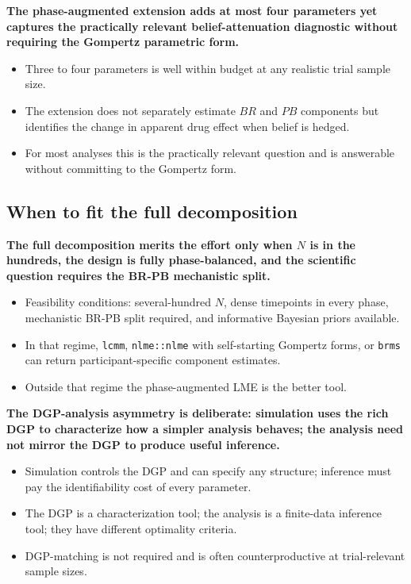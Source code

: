 \documentclass[
  11pt,
]{article}
\begin{document}
\textbf{The phase-augmented extension adds at most four parameters yet captures the practically relevant belief-attenuation diagnostic without requiring the Gompertz parametric form.}

\begin{itemize}\setlength{\itemsep}{2pt}\setlength{\parskip}{0pt}
\item Three to four parameters is well within budget at any realistic trial sample size.
\item The extension does not separately estimate $BR$ and $PB$ components but identifies the change in apparent drug effect when belief is hedged.
\item For most analyses this is the practically relevant question and is answerable without committing to the Gompertz form.
\end{itemize}

\subsection{When to fit the full decomposition}\label{when-to-fit-the-full-decomposition}

\textbf{The full decomposition merits the effort only when $N$ is in the hundreds, the design is fully phase-balanced, and the scientific question requires the BR-PB mechanistic split.}

\begin{itemize}\setlength{\itemsep}{2pt}\setlength{\parskip}{0pt}
\item Feasibility conditions: several-hundred $N$, dense timepoints in every phase, mechanistic BR-PB split required, and informative Bayesian priors available.
\item In that regime, \texttt{lcmm}, \texttt{nlme::nlme} with self-starting Gompertz forms, or \texttt{brms} can return participant-specific component estimates.
\item Outside that regime the phase-augmented LME is the better tool.
\end{itemize}

\textbf{The DGP-analysis asymmetry is deliberate: simulation uses the rich DGP to characterize how a simpler analysis behaves; the analysis need not mirror the DGP to produce useful inference.}

\begin{itemize}\setlength{\itemsep}{2pt}\setlength{\parskip}{0pt}
\item Simulation controls the DGP and can specify any structure; inference must pay the identifiability cost of every parameter.
\item The DGP is a characterization tool; the analysis is a finite-data inference tool; they have different optimality criteria.
\item DGP-matching is not required and is often counterproductive at trial-relevant sample sizes.
\end{itemize}
\end{document}
